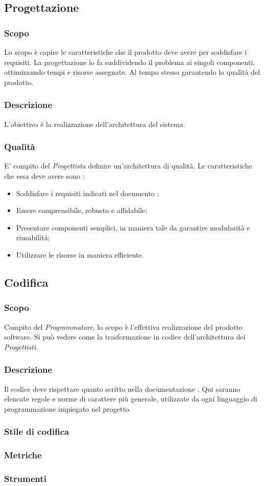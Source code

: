 \subsection{Progettazione}
\subsubsection{Scopo}
Lo scopo è capire le caratteristiche che il prodotto deve avere per soddisfare i requisiti. La progettazione lo fa suddividendo il problema ai singoli componenti, ottimizzando tempi e risorse assegnate. Al tempo stesso garantendo la qualità del prodotto.

\subsubsection{Descrizione}
L’obiettivo è la realizzazione dell’architettura del sistema.

\subsubsection{Qualità}
E’ compito del \textit{Progettista} definire un’architettura di qualità. Le caratteristiche che essa deve avere sono :
\begin{itemize}
  \item Soddisfare i requisiti indicati nel documento \AdR;
  \item Essere comprensibile, robusto e affidabile;
  \item Presentare componenti semplici, in maniera tale da garantire modularità e riusabilità;
  \item Utilizzare le risorse in maniera efficiente.
\end{itemize}

\subsection{Codifica}
\subsubsection{Scopo}
Compito del \textit{Programmatore}, lo scopo è l’effettiva realizzazione del prodotto software. Si può vedere come la trasformazione in codice dell’architettura dei \textit{Progettisti}.

\subsubsection{Descrizione}
Il codice deve rispettare quanto scritto nella documentazione \PdQ. Qui saranno elencate regole e norme di carattere più generale, utilizzate da ogni linguaggio di programmazione impiegato nel progetto.

\subsubsection{Stile di codifica}
\subsubsection{Metriche}
\subsubsection{Strumenti}
